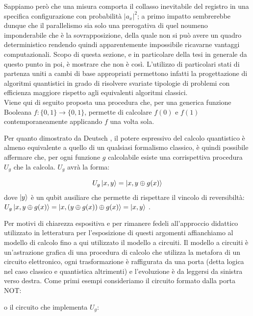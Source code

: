 \documentclass[12pt,a4paper,openright]{report}
\newcommand*\xor{\mathbin{\oplus}}
\begin{document}
Sappiamo però che una misura comporta il collasso inevitabile del registro in una specifica configurazione con probabilità ${\left\vert{a_x}\right\vert}^2$; a primo impatto sembrerebbe dunque che il parallelismo
sia solo una prerogativa di quel noumeno imponderabile che è la sovrapposizione, della quale non si può avere un quadro deterministico rendendo quindi apparentemente impossibile ricavarne vantaggi computazionali.
Scopo di questa sezione, e in particolare della tesi in generale da questo punto in poi, è mostrare che non è così. L'utilizzo di particolari stati di partenza uniti a cambi di base appropriati permettono infatti
la progettazione di algoritmi quantistici in grado di risolvere svariate tipologie di problemi con efficienza maggiore rispetto agli equivalenti algoritmi classici.\\
Viene qui di seguito proposta una procedura che, per una generica funzione Booleana $f:\{0,1\} \rightarrow \{0,1\}$, permette di calcolare $f(0)$ e $f(1)$ contemporaneamente applicando $f$ una volta sola.\par
Per quanto dimostrato da Deutsch \cite{ref12}, il potere espressivo del calcolo quantistico è almeno equivalente a quello di un qualsiasi formalismo classico, è quindi possibile affermare che, per ogni funzione
$g$ calcolabile esiste una corrispettiva procedura $U_g$ che la calcola. $U_g$ avrà la forma:

\[
    U_g\ket{x,y} = \ket{x, y\xor g(x)}
\]
dove $\ket{y}$ è un qubit ausiliare che permette di rispettare il vincolo di reversibiltà: $U_g\ket{x, y \xor g(x)} = \ket{x, (y\xor g(x)) \xor g(x)} = \ket{x, y}$ .

Per motivi di chiarezza espositiva e per rimanere fedeli all'approccio didattico utilizzato in letteratura per l'esposizione di questi argomenti affianchiamo al modello di calcolo fino a qui utilizzato il modello
a circuiti. Il modello a circuiti è un'astrazione grafica di una procedura di calcolo che utilizza la metafora di un circuito elettronico, ogni trasformazione è raffigurata da una porta 
(detta logica nel caso classico e quantistica altrimenti) e l'evoluzione è da leggersi da sinistra verso destra. Come primi esempi consideriamo il circuito formato dalla porta NOT:

\begin{figure}[h] 
    \centering
\end{figure}
o il circuito che implementa $U_g$:
\end{document}
